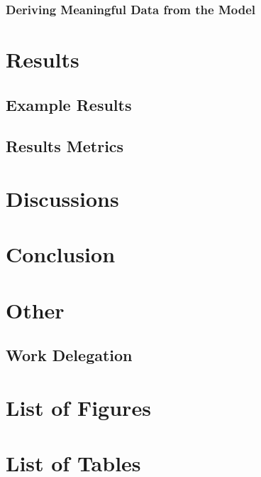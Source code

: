 \documentclass[11pt]{article}
\begin{document}
            \subsubsection{Deriving Meaningful Data from the Model}

    \FloatBarrier
    \section{Results}
        \subsection{Example Results}

        \subsection{Results Metrics}
    
    \FloatBarrier
    \section{Discussions}

    \FloatBarrier
    \section{Conclusion}

    \FloatBarrier
    \section{Other}
        \subsection{Work Delegation}

    \FloatBarrier
    \appendix
    
	

	\section{List of Figures}
		\makeatletter
		\makeatother

	\section{List of Tables}
		\makeatletter
		\makeatother
\end{document}
